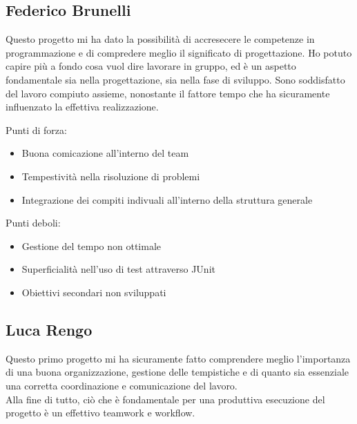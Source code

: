 
\subsection*{Federico Brunelli}

\textsf{\small Questo progetto mi ha dato la possibilità di accresecere le competenze in programmazione e di compredere meglio il significato di progettazione.
Ho potuto capire più a fondo cosa vuol dire lavorare in gruppo, ed è un aspetto fondamentale sia nella progettazione, sia nella fase di sviluppo.
Sono soddisfatto del lavoro compiuto assieme, nonostante il fattore tempo che ha sicuramente influenzato la effettiva realizzazione.}

\begin{flushleft}
	
	\textsf{\small Punti di forza: }\\
	
	\begin{itemize}
		\item \textsf{\small Buona comicazione all'interno del team} 
		\item \textsf{\small Tempestività nella risoluzione di problemi}
		\item \textsf{\small Integrazione dei compiti indivuali all'interno della struttura generale}
	\end{itemize}
	
	\textsf{\small Punti deboli: }\\
	
	\begin{itemize}
		\item \textsf{\small Gestione del tempo non ottimale}
		\item \textsf{\small Superficialità nell'uso di test attraverso JUnit}
		\item \textsf{\small Obiettivi secondari non sviluppati}
	\end{itemize}
	
\end{flushleft}


\subsection*{Luca Rengo}

\textsf{\small Questo primo progetto mi ha sicuramente fatto comprendere meglio l'importanza di una buona organizzazione, gestione delle tempistiche e di quanto sia essenziale una corretta coordinazione e comunicazione del lavoro.}\\
\textsf{\small Alla fine di tutto, ciò che è fondamentale per una produttiva esecuzione del progetto è un effettivo teamwork e workflow. } %

